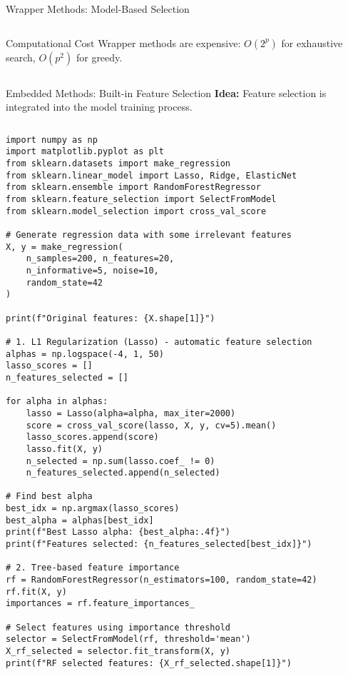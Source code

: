 \documentclass[aspectratio=169,11pt]{beamer}
\begin{document}
\begin{frame}[fragile]{Wrapper Methods: Model-Based Selection}
\begin{columns}
\begin{column}{0.45\textwidth}
\begin{alertblock}{Computational Cost}
Wrapper methods are expensive: $O(2^p)$ for exhaustive search, $O(p^2)$ for greedy.
\end{alertblock}
\end{column}
\end{columns}
\end{frame}

\begin{frame}[fragile]{Embedded Methods: Built-in Feature Selection}
\textbf{Idea:} Feature selection is integrated into the model training process.

\begin{columns}
\begin{column}{0.55\textwidth}
\begin{lstlisting}
import numpy as np
import matplotlib.pyplot as plt
from sklearn.datasets import make_regression
from sklearn.linear_model import Lasso, Ridge, ElasticNet
from sklearn.ensemble import RandomForestRegressor
from sklearn.feature_selection import SelectFromModel
from sklearn.model_selection import cross_val_score

# Generate regression data with some irrelevant features
X, y = make_regression(
    n_samples=200, n_features=20, 
    n_informative=5, noise=10,
    random_state=42
)

print(f"Original features: {X.shape[1]}")

# 1. L1 Regularization (Lasso) - automatic feature selection
alphas = np.logspace(-4, 1, 50)
lasso_scores = []
n_features_selected = []

for alpha in alphas:
    lasso = Lasso(alpha=alpha, max_iter=2000)
    score = cross_val_score(lasso, X, y, cv=5).mean()
    lasso_scores.append(score)
    lasso.fit(X, y)
    n_selected = np.sum(lasso.coef_ != 0)
    n_features_selected.append(n_selected)

# Find best alpha
best_idx = np.argmax(lasso_scores)
best_alpha = alphas[best_idx]
print(f"Best Lasso alpha: {best_alpha:.4f}")
print(f"Features selected: {n_features_selected[best_idx]}")

# 2. Tree-based feature importance
rf = RandomForestRegressor(n_estimators=100, random_state=42)
rf.fit(X, y)
importances = rf.feature_importances_

# Select features using importance threshold
selector = SelectFromModel(rf, threshold='mean')
X_rf_selected = selector.fit_transform(X, y)
print(f"RF selected features: {X_rf_selected.shape[1]}")


\end{lstlisting}
\end{column}
\end{columns}
\end{frame}
\end{document}
